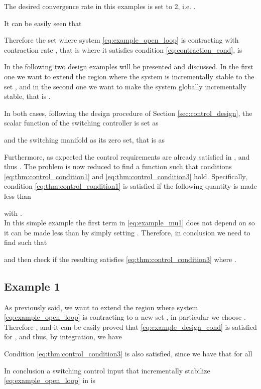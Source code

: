 \documentclass[letterpaper, 10 pt, conference]{ieeeconf}
\begin{document}
The desired convergence rate  in this examples is set to 2, i.e. .

It can be easily seen that

Therefore the set  where system \eqref{eq:example_open_loop} is contracting with contraction rate , that is where it satisfies condition \eqref{eq:contraction_cond}, is  


In the following two design examples will be presented and discussed. In the first one we want to extend the region  where the system is incrementally stable to the set , and in the second one we want to make the system globally incrementally stable, that is .

In both cases, following the design procedure of Section \ref{sec:control_design}, the scalar function  of the switching controller is set as

and the switching manifold  as its zero set, that is as


Furthermore, as expected the control requirements are already satisfied in , and thus . The problem is now reduced to find a function  such that conditions \eqref{eq:thm:control_condition1} and \eqref{eq:thm:control_condition3} hold. Specifically, condition \eqref{eq:thm:control_condition1} is satisfied if the following quantity is made less than 

with .\\
In this simple example the first term in \eqref{eq:example_mu1} does not depend on  so it can be made less than  by simply setting . Therefore, in conclusion we need to find  such that

and then check if the resulting  satisfies \eqref{eq:thm:control_condition3} where .

\subsection{Example 1}
\label{sec:example_1}
As previously said, we want to extend the region where system \eqref{eq:example_open_loop} is contracting to a new set , in particular we choose . Therefore , and it can be easily proved that \eqref{eq:example_design_cond} is satisfied for , and thus, by integration, we have 


Condition \eqref{eq:thm:control_condition3} is also satisfied, since we have that for all 




In conclusion a switching control input that incrementally stabilize \eqref{eq:example_open_loop} in  is
\end{document}
